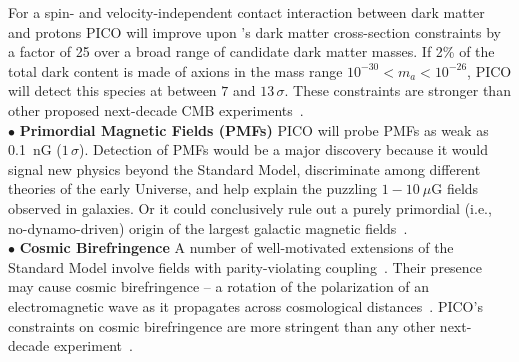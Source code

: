 \documentclass[PICOAPC.tex]{subfiles}
\begin{document}
For a spin- and velocity-independent contact interaction between dark matter and protons PICO will improve upon \planck 's dark matter cross-section constraints by a factor of 25 over a broad range of candidate dark matter masses. If 2\% of the total dark content is made of axions in the mass range $10^{-30} < m_{a} < 10^{-26}$, PICO will detect this species at between $7$ and $13\,\sigma$.  These constraints are stronger than other proposed next-decade CMB experiments~\citep{gluscevic_swp}. \\
%
$\bullet$ {\bf Primordial Magnetic Fields (PMFs)} \hspace{0.1in} PICO will probe PMFs as weak as 0.1~nG ($1\,\sigma$).  Detection of PMFs would be a major discovery because it would signal new physics beyond the Standard Model, discriminate among different theories of the early Universe, and help explain the puzzling $1 - 10~\mu$G fields observed in galaxies.  Or it could conclusively rule out a purely primordial (i.e., no-dynamo-driven) origin of the largest galactic magnetic fields~\citep{Widrow:2002ud,Widrow:2011hs,Athreya:1998,Grasso:2000wj,Vachaspati:1991nm,Turner:1987bw,Ratra:1991bn,DiazGil:2007dy,Barnaby:2012tk,Long:2013tha,Durrer:2013pga}. \\
%
$\bullet$ {\bf Cosmic Birefringence} \hspace{0.1in}
A number of well-motivated extensions of the Standard Model involve fields with parity-violating coupling~\citep{Freese:1990rb,Frieman:1995pm,Carroll:1998zi,Kaloper:2005aj,2008PhRvL.101n1101C,Gluscevic:2010vv}. Their presence may cause cosmic birefringence -- a rotation of the polarization of an electromagnetic wave as it propagates across cosmological distances~\cite{Harari:1992ea,Carroll:1989vb,Carroll:1998zi}. PICO's constraints on cosmic birefringence are more stringent than any other next-decade experiment~\cite{pogosian_2019}. 
\end{document}
